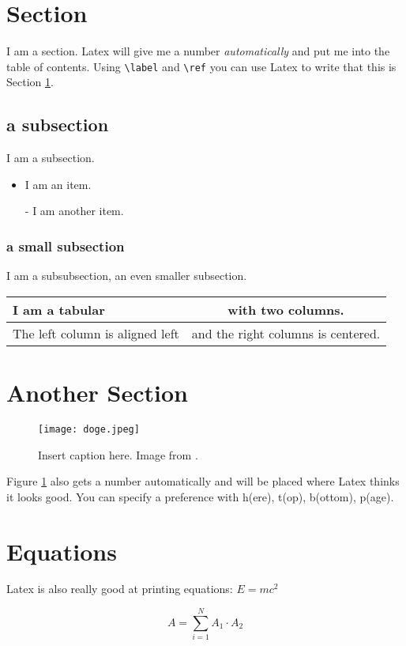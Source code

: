 \documentclass[twoside,a4paper,article]{combine}
\begin{document}
\section{Section}
\label{section}
I am a section. Latex will give me a number \emph{automatically} and put me into the table of contents.
Using \verb+\label+ and \verb+\ref+ you can use Latex to write that this is Section \ref{section}.

\subsection{a subsection}
I am a subsection.

\begin{itemize}
\item I am an item.
\item [-] I am another item.
\end{itemize}


\subsubsection{a small subsection}
I am a subsubsection, an even smaller subsection.

\begin{tabular}{|l|c|}
\hline
I am a tabular & with two columns. \\
\hline
The left column is aligned left & and the right columns is centered. \\
\hline
\end{tabular}


\section{Another Section}

\begin{figure}[h]
\centering
\texttt{[image: doge.jpeg]}
\caption{Insert caption here. Image from \cite{lenna}. }
\label{example_figure}
\end{figure}
Figure \ref{example_figure} also gets a number automatically and will be placed where Latex thinks it looks good. You can specify a preference with h(ere), t(op), b(ottom), p(age).

\section{Equations}
Latex is also really good at printing equations: $E=mc^2$

\begin{equation}
A = \sum_{i=1}^N A_1 \cdot A_2
\end{equation}






\end{document}
